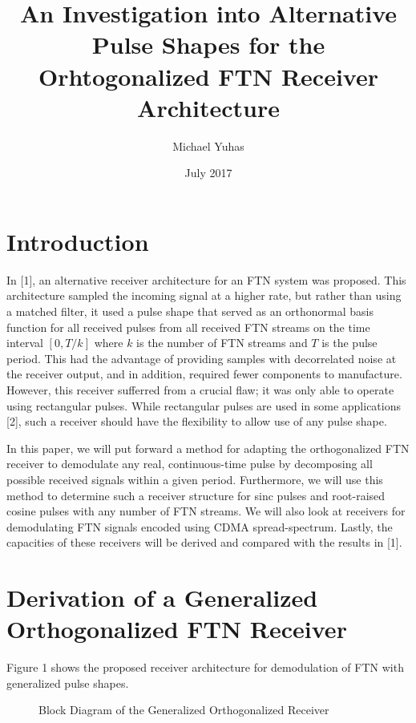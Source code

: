 \documentclass{article}
\title{An Investigation into Alternative Pulse Shapes for the Orhtogonalized FTN Receiver Architecture}
\author{Michael Yuhas}
\date{July 2017}
\begin{document}
\maketitle

\section{Introduction}
In [1], an alternative receiver architecture for an FTN system was proposed.  This architecture sampled the incoming signal at a higher rate, but rather than using a matched filter, it used a pulse shape that served as an orthonormal basis function for all received pulses from all received FTN streams on the time interval $[0,T/k]$ where $k$ is the number of FTN streams and $T$ is the pulse period.  This had the advantage of providing samples with decorrelated noise at the receiver output, and in addition, required fewer components to manufacture.  However, this receiver sufferred from a crucial flaw; it was only able to operate using rectangular pulses.  While rectangular pulses are used in some applications [2], such a receiver should have the flexibility to allow use of any pulse shape.
\par
In this paper, we will put forward a method for adapting the orthogonalized FTN receiver to demodulate any real, continuous-time pulse by decomposing all possible received signals within a given period.  Furthermore, we will use this method to determine such a receiver structure for sinc pulses and root-raised cosine pulses with any number of FTN streams.  We will also look at receivers for demodulating FTN signals encoded using CDMA spread-spectrum.  Lastly, the capacities of these receivers will be derived and compared with the results in [1].
\section{Derivation of a Generalized Orthogonalized FTN Receiver}
Figure 1 shows the proposed receiver architecture for demodulation of FTN with generalized pulse shapes.
\begin{figure}[htbp]
  \centering
  
  \caption{Block Diagram of the Generalized Orthogonalized Receiver}
\end{figure}
\end{document}
